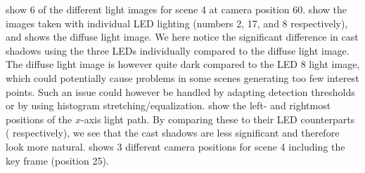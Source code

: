 \documentclass[thesis.tex]{subfiles}
\begin{document}
 show 6 of the different light images for scene 4 at camera position 60.  show the images taken with individual LED lighting (numbers 2, 17, and 8 respectively), and  shows the diffuse light image. We here notice the significant difference in cast shadows using the three LEDs individually compared to the diffuse light image. The diffuse light image is however quite dark compared to the LED 8 light image, which could potentially cause problems in some scenes generating too few interest points. Such an issue could however be handled by adapting detection thresholds or by using histogram stretching/equalization. 
 show the left- and rightmost positions of the $x$-axis light path. By comparing these to their LED counterparts ( respectively), we see that the cast shadows are less significant and therefore look more natural.
 shows 3 different camera positions for scene 4 including the key frame (position 25).
%
\end{document}
